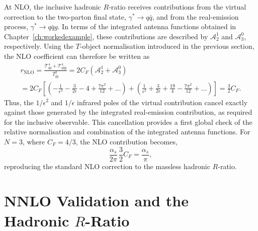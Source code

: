 At NLO, the inclusive hadronic $R$-ratio receives contributions from the virtual correction to the
two-parton final state, $\gamma^*\to q\bar q$, and from the real-emission process,
$\gamma^*\to q\bar q g$. In terms of the integrated antenna functions obtained in
Chapter~\ref{ch:workedexample}, these contributions are described by $\mathcal A_2^1$ and
$\mathcal A_3^0$, respectively. Using the $T$-object normalisation introduced in the previous
section, the NLO coefficient can therefore be written as
\begin{equation}
    \begin{gathered}
        r_\text{NLO} = \frac{\mathcal T_{q\bar q}^4+\mathcal T_{q\bar qg}^4}{T_{q\bar q}^2} = 2C_F\left(\mathcal A_2^1 + \mathcal A_3^0\right)\\
        = 2C_F\left[\left(-\frac{1}{\epsilon^2}-\frac{3}{2\epsilon}-4+\frac{7\pi^2}{12}+\ldots\right)+\left(\frac{1}{\epsilon^2}+\frac3{2\epsilon}+\frac{19}4-\frac{7\pi^2}{12}+\ldots\right)\right]=\frac32 C_F.
    \end{gathered}
\end{equation}
Thus, the $1/\epsilon^2$ and $1/\epsilon$ infrared poles of the virtual contribution cancel exactly
against those generated by the integrated real-emission contribution, as required for the inclusive
observable. This cancellation provides a first global check of the relative normalisation and
combination of the integrated antenna functions. For $N=3$, where $C_F=4/3$, the NLO contribution
becomes,
\begin{equation}
    \frac{\alpha_s}{2\pi}\,\frac{3}{2}C_F=\frac{\alpha_s}{\pi},
\end{equation}
reproducing the standard NLO correction to the massless hadronic $R$-ratio.

\section{NNLO Validation and the Hadronic $R$-Ratio}\label{sec:rratioNNLO}

